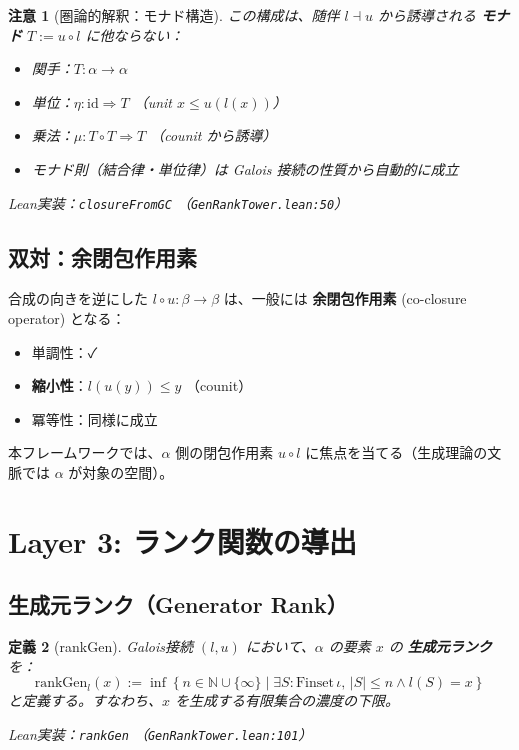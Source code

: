 \documentclass[a4paper,12pt]{ltjsarticle}
\newtheorem{definition}{定義}[section]
\newtheorem{remark}[definition]{注意}
\newcommand{\N}{\mathbb{N}}
\newcommand{\Lean}[1]{\texttt{\color{blue}#1}}
\begin{document}
\begin{remark}[圏論的解釈：モナド構造]
この構成は、随伴 $l \dashv u$ から誘導される \textbf{モナド} $T := u \circ l$ に他ならない：
\begin{itemize}
  \item 関手：$T : \alpha \to \alpha$
  \item 単位：$\eta : \mathrm{id} \Rightarrow T$ （unit $x \le u(l(x))$）
  \item 乗法：$\mu : T \circ T \Rightarrow T$ （counit から誘導）
  \item モナド則（結合律・単位律）は Galois 接続の性質から自動的に成立
\end{itemize}

Lean実装：\Lean{closureFromGC} （\texttt{GenRankTower.lean:50}）
\end{remark}

\subsection{双対：余閉包作用素}

合成の向きを逆にした $l \circ u : \beta \to \beta$ は、一般には \textbf{余閉包作用素} (co-closure operator) となる：
\begin{itemize}
  \item 単調性：✓
  \item \textbf{縮小性}：$l(u(y)) \le y$ （counit）
  \item 冪等性：同様に成立
\end{itemize}

本フレームワークでは、$\alpha$ 側の閉包作用素 $u \circ l$ に焦点を当てる（生成理論の文脈では $\alpha$ が対象の空間）。

\section{Layer 3: ランク関数の導出}

\subsection{生成元ランク（Generator Rank）}

\begin{definition}[rankGen]
Galois接続 $(l, u)$ において、$\alpha$ の要素 $x$ の \textbf{生成元ランク} を：
\[
  \mathrm{rankGen}_l(x) := \inf \left\{ n \in \N \cup \{\infty\} \mid \exists S : \mathrm{Finset}\, \iota,\, |S| \le n \land l(S) = x \right\}
\]
と定義する。すなわち、$x$ を生成する有限集合の濃度の下限。

Lean実装：\Lean{rankGen} （\texttt{GenRankTower.lean:101}）
\end{definition}
\end{document}
